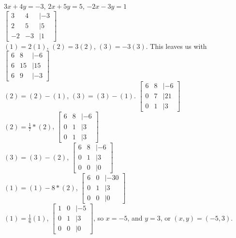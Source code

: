 \documentclass[10pt,letter]{article}
\begin{document}
$3x+4y=-3$, $2x+5y=5$, $-2x-3y=1$\\ 
$\begin{bmatrix}
3 & 4 &| -3\\ 
2 & 5 &| 5\\
-2 & -3 &| 1\end{bmatrix}$\\ 
$(1)= 2(1)$, $(2)=3(2)$, $(3)=-3(3)$. This leaves us with $\begin{bmatrix}
6 & 8 &| -6\\ 
6 & 15 &| 15\\
6 & 9 &| -3\end{bmatrix}$
\\ $(2)=(2)-(1)$, $(3)=(3)-(1)$. $\begin{bmatrix}
6 & 8 &| -6\\ 
0 & 7 &| 21\\
0 & 1 &| 3\end{bmatrix}$
\\ $(2)=\frac{1}{7}*(2)$, $\begin{bmatrix}
6 & 8 &| -6\\ 
0 & 1 &| 3\\
0 & 1 &| 3\end{bmatrix}$
\\ $(3)=(3)-(2)$, $\begin{bmatrix}
6 & 8 &| -6\\ 
0 & 1 &| 3\\
0 & 0 &| 0\end{bmatrix}$
\\ $(1)=(1)-8*(2)$, $\begin{bmatrix}
6 & 0 &| -30\\ 
0 & 1 &| 3\\
0 & 0 &| 0\end{bmatrix}$
\\ $(1)=\frac{1}{6}(1)$, $\begin{bmatrix}
1 & 0 &| -5\\ 
0 & 1 &| 3\\
0 & 0 &| 0\end{bmatrix}$, so $x=-5$, and $y=3$, or $(x,y)=(-5,3)$. 
\end{document}

